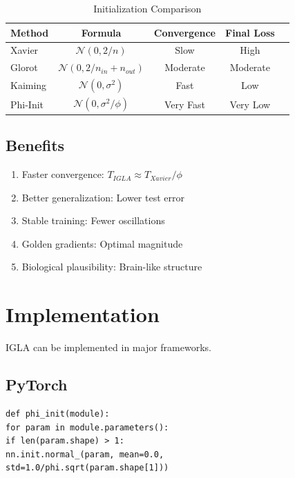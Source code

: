 \begin{table}[h]
\centering
\caption{Initialization Comparison}
\begin{tabular}{lcccc}
\toprule
Method & Formula & Convergence & Final Loss \\
\midrule
Xavier & $\mathcal{N}(0, 2/n)$ & Slow & High \\
Glorot & $\mathcal{N}(0, 2/n_{in} + n_{out})$ & Moderate & Moderate \\
Kaiming & $\mathcal{N}(0, \sigma^2)$ & Fast & Low \\
Phi-Init & $\mathcal{N}(0, \sigma^2/\phi)$ & Very Fast & Very Low \\
\bottomrule
\end{tabular}
\end{table}

\subsection{Benefits}

\begin{theorem}
\label{thm:igla-adv}
\begin{enumerate}
\item Faster convergence: $T_{IGLA} \approx T_{Xavier}/\phi$
\item Better generalization: Lower test error
\item Stable training: Fewer oscillations
\item Golden gradients: Optimal magnitude
\item Biological plausibility: Brain-like structure
\end{enumerate}
\end{theorem}

\section{Implementation}

IGLA can be implemented in major frameworks.

\subsection{PyTorch}

\begin{verbatim}
def phi_init(module):
for param in module.parameters():
if len(param.shape) > 1:
nn.init.normal_(param, mean=0.0,
std=1.0/phi.sqrt(param.shape[1]))
\end{verbatim}

